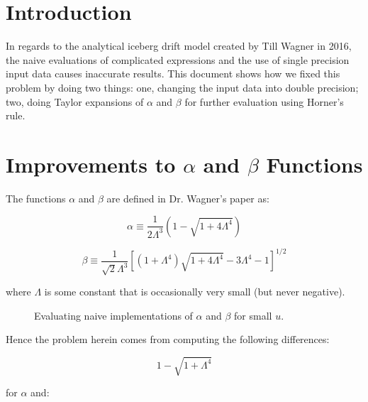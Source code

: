 \documentclass[12pt]{article}
\newcommand{\forceindent}{\leavevmode{\parindent=2em\indent}}
\begin{document}
\section{Introduction}

\forceindent In regards to the analytical iceberg drift model created 
by Till Wagner in 2016, the naive evaluations of complicated 
expressions and the use of single precision input data causes 
inaccurate results. This document shows how we fixed this problem by 
doing two things: one, changing the input data into double precision; 
two, doing Taylor expansions of $\alpha$ and $\beta$ for further 
evaluation using Horner's rule.
    
\section{Improvements to $\alpha$ and $\beta$ Functions}
The functions $\alpha$ and $\beta$ are defined in Dr. Wagner's paper
as:

    \begin{equation}
        \alpha \equiv \frac{1}{2\Lambda^3}(1-\sqrt{1+4\Lambda^4})
    \end{equation} 

    \begin{equation}
        \beta \equiv \frac{1}{\sqrt{2}\Lambda^3}[(1+\Lambda^4)
        \sqrt{1+4\Lambda^4} -3\Lambda^4-1]^{1/2}
    \end{equation}

where $\Lambda$ is some constant that is occasionally very small (but
never negative). 

    \begin{figure}[h]
        \centering
        \caption{Evaluating naive implementations of $\alpha$ and 
                $\beta$ for small $u$.}
        \label{fig:naive}
    \end{figure}

Hence the problem herein comes from computing the following 
differences: 

    \begin{equation}
        1 - \sqrt{1+\Lambda^4}
    \end{equation}

for $\alpha$ and:
\end{document}
